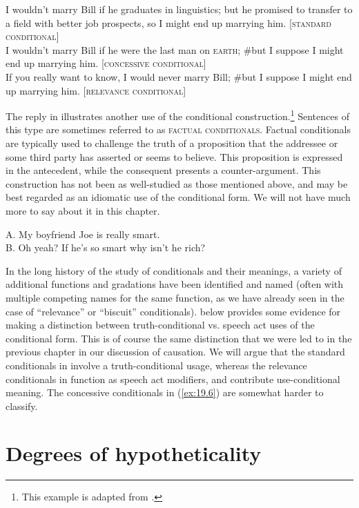\ea \label{ex:19.9}
\ea  I wouldn’t marry Bill if he graduates in linguistics; but he promised to transfer to a field with better job prospects, so I might end up marrying him. \hfill [\textsc{standard} \textsc{conditional}]\\
\ex I wouldn’t marry Bill if he were the last man on \textsc{earth}; \#but I suppose I might end up marrying him. \hfill  [\textsc{concessive conditional}]\\
\ex If you really want to know, I would never marry Bill; \#but I suppose I might end up marrying him. \hfill  [\textsc{relevance} \textsc{conditional}]
                       \z
\z



The reply in  illustrates another use of the conditional construction.\footnote{This example is adapted from \citet[671]{BhattPancheva2006}.} Sentences of this type are sometimes referred to as \textsc{factual} \textsc{conditionals}. Factual conditionals are typically used to challenge the truth of a proposition that the addressee or some third party has asserted or seems to believe. This proposition is expressed in the antecedent, while the consequent presents a counter-argument. This construction has not been as well-studied as those mentioned above, and may be best regarded as an idiomatic use of the conditional form. We will not have much more to say about it in this chapter.


\ea \label{ex:19.5}
A. My boyfriend Joe is really smart.\\
B. Oh yeah? If he’s so smart why isn’t he rich?
\z


In the long history of the study of conditionals and their meanings, a variety of additional functions and gradations have been identified and named (often with multiple competing names for the same function, as we have already seen in the case of “relevance” or “biscuit” conditionals).  below provides some evidence for making a distinction between truth-conditional vs. speech act uses of the conditional form. This is of course the same distinction that we were led to in the previous chapter in our discussion of causation. We will argue that the standard conditionals in  involve a truth-conditional usage, whereas the relevance conditionals in  function as speech act modifiers, and contribute use-conditional meaning. The concessive conditionals in (\ref{ex:19.6}) are somewhat harder to classify.


\section{Degrees of hypotheticality}\label{sec:19.3}

